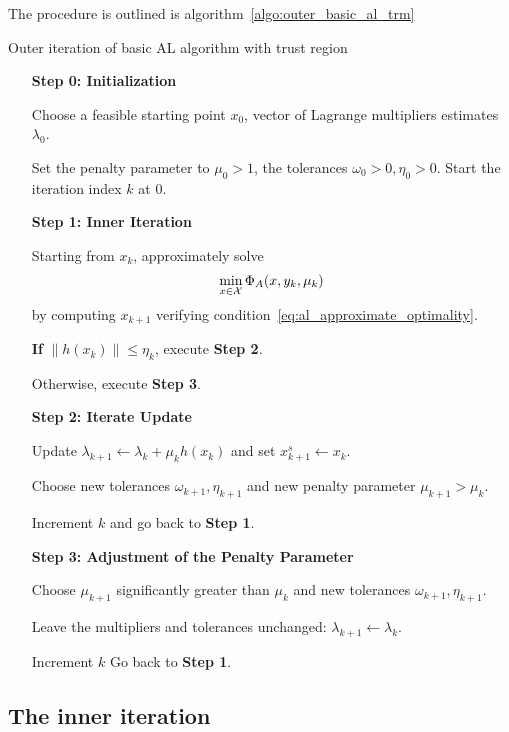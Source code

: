 \documentclass[10pt]{article}
\begin{document}
	
	The procedure is outlined is algorithm~\ref{algo:outer_basic_al_trm} 
	
	\begin{algorithm}
		\caption{Outer iteration of basic AL algorithm with trust region}\label{algo:outer_basic_al_trm}
		\begin{enumerate}
			\item[\textbf{Step 0: Initialization}]
			
			Choose a feasible starting point $x_0$, vector of Lagrange multipliers estimates $\lambda_0$. 
			
			Set the penalty parameter to $\mu_0>1$, the tolerances $\omega_0>0, \eta_0 > 0$. Start the  iteration index $k$ at $0$.
			\item[\textbf{Step 1: Inner Iteration}]
			
			Starting from $x_k$, approximately solve \[\min_{x\in {\mathcal{X}}} \Phi_A(x,y_k,\mu_k)\] by computing $x_{k+1}$ verifying condition~\eqref{eq:al_approximate_optimality}.
			
			\textbf{If} $\|h(x_k)\| \le \eta_k$, execute \textbf{Step 2}.
			
			Otherwise, execute \textbf{Step 3}.
			
			\item[\textbf{Step 2: Iterate Update}]
			
			Update $\lambda_{k+1} \gets \lambda_k + \mu_kh(x_k)$ and set $x_{k+1}^s \gets x_k $.
			
			Choose new tolerances \(\omega_{k+1}, \eta_{k+1}\) and new penalty parameter \(\mu_{k+1} > \mu_k\).
			
			Increment $k$ and go back to \textbf{Step 1}.
			
			\item[\textbf{Step 3: Adjustment of the Penalty Parameter}] 
			
			Choose $\mu_{k+1}$ significantly greater than $\mu_k$ and new tolerances \(\omega_{k+1}, \eta_{k+1}\).
			
			Leave the multipliers and tolerances unchanged: $\lambda_{k+1} \gets \lambda_k$.
			
			Increment $k$ Go back to \textbf{Step 1}.
		\end{enumerate}
	\end{algorithm}
	
	\subsection{The inner iteration}
	
\end{document}
